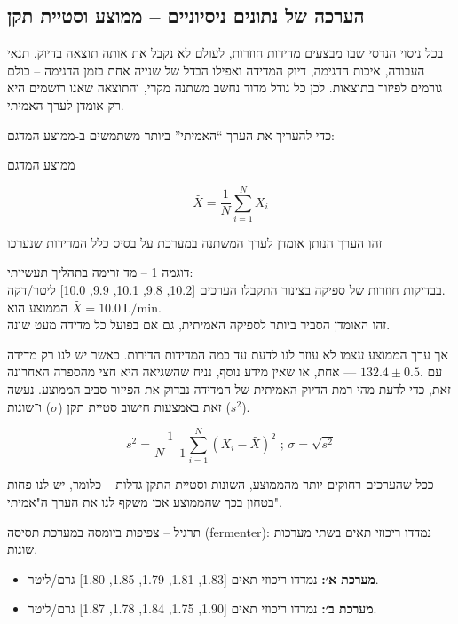 \documentclass[
  hebrew,
  letterpaper,
  DIV=11,
  numbers=noendperiod]{scrreprt}
\providecommand{\tightlist}{%
  \setlength{\itemsep}{0pt}\setlength{\parskip}{0pt}}
\begin{document}
\subsection{\texorpdfstring{{הערכה של נתונים ניסיוניים -- ממוצע וסטיית
תקן}}{הערכה של נתונים ניסיוניים -- ממוצע וסטיית תקן}}\label{ux5d4ux5e2ux5e8ux5dbux5d4-ux5e9ux5dc-ux5e0ux5eaux5d5ux5e0ux5d9ux5dd-ux5e0ux5d9ux5e1ux5d9ux5d5ux5e0ux5d9ux5d9ux5dd-ux5deux5deux5d5ux5e6ux5e2-ux5d5ux5e1ux5d8ux5d9ux5d9ux5ea-ux5eaux5e7ux5df}

{בכל ניסוי הנדסי שבו מבצעים מדידות חוזרות, לעולם לא נקבל את אותה תוצאה
בדיוק. תנאי העבודה, איכות הדגימה, דיוק המדידה ואפילו הבדל של שנייה אחת
בזמן הדגימה -- כולם גורמים לפיזור בתוצאות. לכן כל גודל מדוד נחשב {משתנה
מקרי}}, {והתוצאה שאנו רושמים היא רק {אומדן} לערך האמיתי}.

{כדי להעריך את הערך ``האמיתי'' ביותר משתמשים ב-{ממוצע המדגם}}:

{{ממוצע המדגם}}

\[\overset{ˉ}{X} = \frac{1}{N}\sum_{i = 1}^{N}X_{i}\]

{זהו הערך הנותן אומדן לערך המשתנה במערכת על בסיס כלל המדידות שנערכו}

{{דוגמה 1 -- מד זרימה בתהליך תעשייתי}:}\\
{בבדיקות חוזרות של ספיקה בצינור התקבלו הערכים {[}10.2, 9.8, 10.1, 9.9,
10.0{]} ליטר/דקה}.\\
{הממוצע הוא} \(\overset{ˉ}{X} = 10.0\text{ L/min}\).\\
{זהו האומדן הסביר ביותר לספיקה האמיתית, גם אם בפועל כל מדידה מעט שונה}.

אך ערך הממוצע עצמו לא עוזר לנו לדעת עד כמה המדידות הדירות. כאשר יש לנו
רק מדידה אחת, או שאין מידע נוסף, נניח שהשגיאה היא חצי מהספרה האחרונה ---
‎\(132.4 \pm 0.5\)‎. עם זאת, כדי לדעת מהי רמת הדיוק האמיתית של המדידה
נבדוק את הפיזור סביב הממוצע. נעשה זאת באמצעות חישוב סטיית תקן
(\(\sigma\)) ו־שונות (\(s^2\)).

\[s^{2} = \frac{1}{N - 1}\sum_{i = 1}^{N}{(X_{i} - \overset{ˉ}{X})^{2}}\text{     ;      }\sigma = \sqrt{s^{2}}\]

{ככל שהערכים רחוקים יותר מהממוצע, השונות וסטיית התקן גדלות -- כלומר, יש
לנו פחות בטחון בכך שהממוצע אכן משקף לנו את הערך ה"אמיתי".}

תרגיל -- צפיפות ביומסה במערכת תסיסה (fermenter): נמדדו ריכוזי תאים בשתי
מערכות שונות.

\begin{itemize}
\tightlist
\item
  \textbf{מערכת א׳:} נמדדו ריכוזי תאים {[}1.83, 1.81, 1.79, 1.85,
  1.80{]} גרם/ליטר.\\
\item
  \textbf{מערכת ב׳:} נמדדו ריכוזי תאים {[}1.90, 1.75, 1.84, 1.78,
  1.87{]} גרם/ליטר.
\end{itemize}
\end{document}
